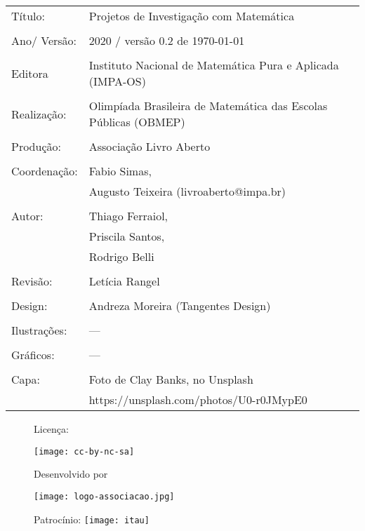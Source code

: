 \begin{tabular}{p{}p{}}
Título: & Projetos de Investigação com Matemática\\
\\
Ano/ Versão: & 2020 / versão 0.2 de \today\\
\\
Editora & Instituto Nacional de Matem\'atica Pura e Aplicada (IMPA-OS)\\
\\
Realização:& Olimp\'iada Brasileira de Matem\'atica das Escolas P\'ublicas (OBMEP)\\
\\
Produção:& Associação Livro Aberto\\
\\
Coordenação: & Fabio Simas, \\
			&  Augusto Teixeira (livroaberto@impa.br)\\
\\
  Autor: & Thiago Ferraiol, \\
         & Priscila Santos, \\
         & Rodrigo Belli \\
\\
Revisão: &  Letícia Rangel  \\
\\
Design: & Andreza Moreira (Tangentes Design) \\
\\
  Ilustrações: & --- \\ 
\\
Gráficos: & --- \\
\\
  Capa: & Foto de Clay Banks, no Unsplash \\
  		& https://unsplash.com/photos/U0-r0JMypE0 \\

\end{tabular}


\begin{figure}[b]
\begin{minipage}[l]{5cm}
\centering

{\large Licença:}

  \texttt{[image: cc-by-nc-sa]}
\end{minipage}\hfill
\begin{minipage}[c]{5cm}
\centering
{\large Desenvolvido por}

\texttt{[image: logo-associacao.jpg]}
\end{minipage}
\begin{minipage}[r]{5cm}
\centering

{\large Patrocínio:}
  \vspace{1em}
  \texttt{[image: itau]}
\end{minipage}
\end{figure}

